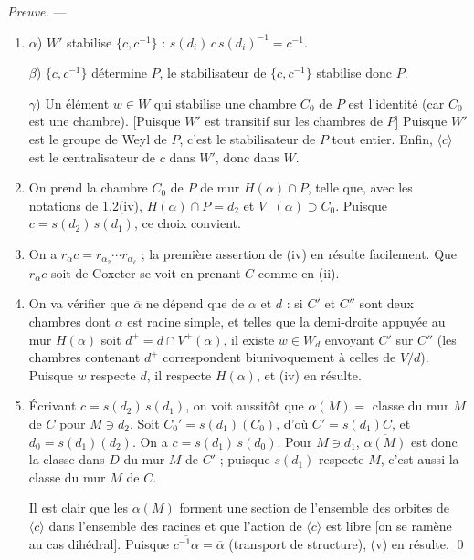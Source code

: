\documentclass[11pt,a4paper]{article}
\theoremstyle{plain}
\theoremstyle{definition}
\begin{document}
\noindent
\textit{Preuve.} --- \leavevmode
\begin{enumerate}[label=(\roman*)]
\item $\alpha$) $W'$ stabilise $\{c, c^{-1}\}$ : $s(d_i)\, c\, s(d_i)^{-1} = c^{-1}$.

$\beta$) $\{c, c^{-1}\}$ d\'etermine $P$, le stabilisateur de $\{c, c^{-1}\}$ stabilise donc $P$.

$\gamma$) Un \'el\'ement $w \in W$ qui stabilise une chambre $C_0$ de $P$ est l'identit\'e (car $C_0$ est une chambre). [Puisque $W'$ est transitif sur les chambres de $P$] Puisque $W'$ est le groupe de Weyl de $P$, c'est le stabilisateur de $P$ tout entier. Enfin, $\langle c \rangle$ est le centralisateur de $c$ dans $W'$, donc dans $W$.

\item On prend la chambre $C_0$ de $P$ de mur $H(\alpha) \cap P$, telle que, avec les notations de 1.2(iv), $H(\alpha) \cap P = d_2$ et $V^{+}(\alpha) \supset C_0$. Puisque $c = s(d_2)\, s(d_1)$, ce choix convient.

\item On a $r_\alpha c = r_{\alpha_2} \cdots r_{\alpha_\ell}$ ; la premi\`ere assertion de (iv) en r\'esulte facilement. Que $r_\alpha c$ soit de Coxeter se voit en prenant $C$ comme en (ii).

\item On va v\'erifier que $\overline{\alpha}$ ne d\'epend que de $\alpha$ et $d$ : si $C'$ et $C''$ sont deux chambres dont $\alpha$ est racine simple, et telles que la demi-droite appuy\'ee au mur $H(\alpha)$ soit $d^{+} = d \cap V^{+}(\alpha)$, il existe $w \in W_d$ envoyant $C'$ sur $C''$ (les chambres contenant $d^{+}$ correspondent biunivoquement \`a celles de $V/d$). Puisque $w$ respecte $d$, il respecte $H(\alpha)$, et (iv) en r\'esulte.

\item \setcounter{enumi}{5} \'Ecrivant $c = s(d_2)\, s(d_1)$, on voit aussit\^ot que $\overline{\alpha(M)} =$ classe du mur $M$ de $C$ pour $M \ni d_2$. Soit $C_0' = s(d_1)(C_0)$, d'o\`u $C' = s(d_1) C$, et $d_0 = s(d_1)(d_2)$. On a $c = s(d_1)\, s(d_0)$. Pour $M \ni d_1$, $\overline{\alpha(M)}$ est donc la classe dans $D$ du mur $M$ de $C'$ ; puisque $s(d_1)$ respecte $M$, c'est aussi la classe du mur $M$ de $C$.

Il est clair que les $\alpha(M)$ forment une section de l'ensemble des orbites de $\langle c \rangle$ dans l'ensemble des racines et que l'action de $\langle c \rangle$ est libre [on se ram\`ene au cas dih\'edral]. Puisque $\overline{c^{-1}\alpha} = \overline{\alpha}$ (transport de structure), (v) en r\'esulte. \qed
\end{enumerate}
\end{document}
